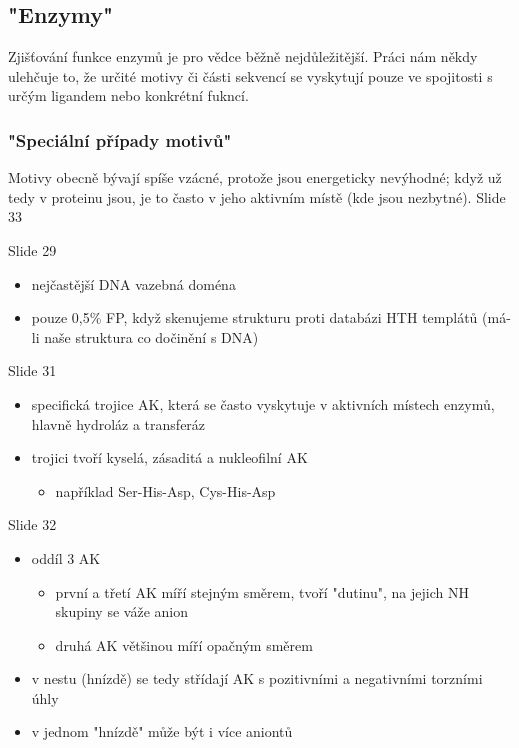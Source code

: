 \documentclass[DIV=8]{scrreprt}
\begin{document}
\subsection{"Enzymy"}

Zjišťování funkce enzymů je pro vědce běžně nejdůležitější. Práci nám někdy ulehčuje to, že určité motivy či části sekvencí se vyskytují pouze ve spojitosti s určým ligandem nebo konkrétní fukncí.

\subsubsection{"Speciální případy motivů"}

Motivy obecně bývají spíše vzácné, protože jsou energeticky nevýhodné; když už tedy v proteinu jsou, je to často v jeho aktivním místě (kde jsou nezbytné). Slide 33

Slide 29
\begin{itemize}
    \item nejčastější DNA vazebná doména
    \item pouze 0,5\% FP, když skenujeme strukturu proti databázi HTH templátů (má-li naše struktura co dočinění s DNA)
\end{itemize}


Slide 31
\begin{itemize}
    \item specifická trojice AK, která se často vyskytuje v aktivních místech enzymů, hlavně hydroláz a transferáz
    \item trojici tvoří kyselá, zásaditá a nukleofilní AK
\begin{itemize}
    \item například Ser-His-Asp, Cys-His-Asp
\end{itemize}

\end{itemize}


Slide 32
\begin{itemize}
    \item oddíl 3 AK
\begin{itemize}
    \item první a třetí AK míří stejným směrem, tvoří "dutinu", na jejich NH skupiny se váže anion
    \item druhá AK většinou míří opačným směrem
\end{itemize}

    \item v nestu (hnízdě) se tedy střídají AK s pozitivními a negativními torzními úhly
    \item v jednom "hnízdě" může být i více aniontů
\end{itemize}
\end{document}
